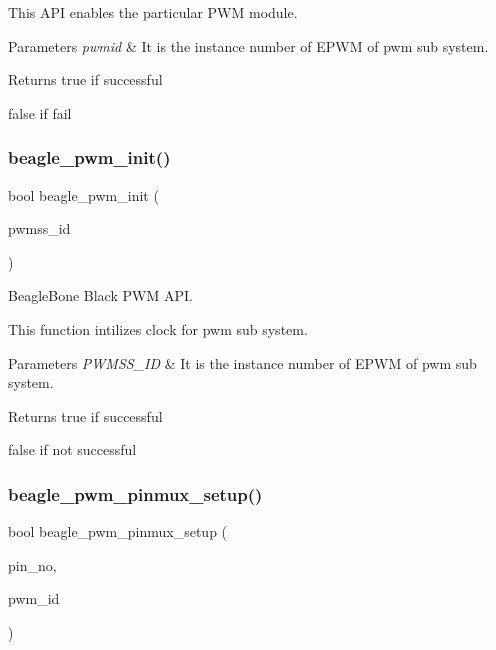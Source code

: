 This A\+PI enables the particular P\+WM module. 


\begin{DoxyParams}{Parameters}
{\em pwmid} & It is the instance number of E\+P\+WM of pwm sub system.\\
\hline
\end{DoxyParams}
\begin{DoxyReturn}{Returns}
true if successful 

false if fail 
\end{DoxyReturn}
\mbox{\label{bbb-pwm_8h_a51cabf390acb95808980e8bfbca7c7f9}} 
\subsubsection{\texorpdfstring{beagle\_pwm\_init()}{beagle\_pwm\_init()}}
{\footnotesize\ttfamily bool beagle\+\_\+pwm\+\_\+init (\begin{DoxyParamCaption}\item[{\mbox{\hyperlink{bbb-pwm_8h_a8e1f51037d4bbe9c36217634f75a628e}{B\+B\+B\+\_\+\+P\+W\+M\+SS}}}]{pwmss\+\_\+id }\end{DoxyParamCaption})}



Beagle\+Bone Black P\+WM A\+PI. 

This function intilizes clock for pwm sub system.


\begin{DoxyParams}{Parameters}
{\em P\+W\+M\+S\+S\+\_\+\+ID} & It is the instance number of E\+P\+WM of pwm sub system.\\
\hline
\end{DoxyParams}
\begin{DoxyReturn}{Returns}
true if successful 

false if not successful 
\end{DoxyReturn}
\mbox{\label{bbb-pwm_8h_aa05074bca0f1e56aac74b846d71c7133}} 
\subsubsection{\texorpdfstring{beagle\_pwm\_pinmux\_setup()}{beagle\_pwm\_pinmux\_setup()}}
{\footnotesize\ttfamily bool beagle\+\_\+pwm\+\_\+pinmux\+\_\+setup (\begin{DoxyParamCaption}\item[{bbb\+\_\+pwm\+\_\+pin\+\_\+t}]{pin\+\_\+no,  }\item[{\mbox{\hyperlink{bbb-pwm_8h_a8e1f51037d4bbe9c36217634f75a628e}{B\+B\+B\+\_\+\+P\+W\+M\+SS}}}]{pwm\+\_\+id }\end{DoxyParamCaption})}



